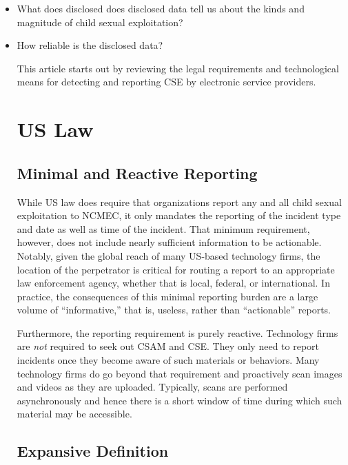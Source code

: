 \documentclass[nonacm,screen]{acmart}
\begin{document}
\begin{itemize}
    \item What does disclosed  does disclosed data tell us about the kinds and magnitude of
    child sexual exploitation?
    \item How reliable is the disclosed data?



This article starts out by reviewing the legal requirements and technological
means for detecting and reporting CSE by electronic service providers.



\section{US Law}


\subsection{Minimal and Reactive Reporting}

While US law does require that organizations report any and all child sexual
exploitation to NCMEC, it only mandates the reporting of the incident type and
date as well as time of the incident. That minimum requirement, however, does
not include nearly sufficient information to be actionable. Notably, given the
global reach of many US-based technology firms, the location of the perpetrator
is critical for routing a report to an appropriate law enforcement agency,
whether that is local, federal, or international. In practice, the consequences
of this minimal reporting burden are a large volume of ``informative,'' that is,
useless, rather than ``actionable'' reports.

Furthermore, the reporting requirement is purely reactive. Technology firms are
\emph{not} required to seek out CSAM and CSE. They only need to report incidents
once they become aware of such materials or behaviors. Many technology firms do
go beyond that requirement and proactively scan images and videos as they are
uploaded. Typically, scans are performed asynchronously and hence there is a
short window of time during which such material may be accessible.


\subsection{Expansive Definition}


\end{itemize}
\end{document}
